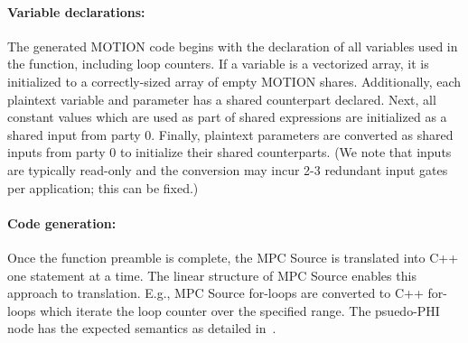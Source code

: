 
\squeeze
\paragraph{Variable declarations:}

The generated MOTION code begins with the declaration of all variables used in the function, including loop counters.  If a variable is a vectorized array, it is initialized to a correctly-sized array of empty MOTION shares.  Additionally, each plaintext variable and parameter has a shared counterpart declared.  Next, all constant values which are used as part of shared expressions are initialized as a shared input from party 0. Finally, plaintext parameters are converted as shared inputs from party 0 to initialize their shared counterparts. (We note that inputs are typically read-only and
the conversion may incur 2-3 redundant input gates per application; this can be fixed.)

\squeeze
\paragraph{Code generation:}
Once the function preamble is complete, the MPC Source is translated into C++ one statement at a time. The linear structure of MPC Source enables this approach to translation. 
E.g., MPC Source for-loops are converted to C++ for-loops which iterate the loop counter over the specified range. The psuedo-PHI node has the expected semantics as detailed in~\cite{Anon_TR}.

